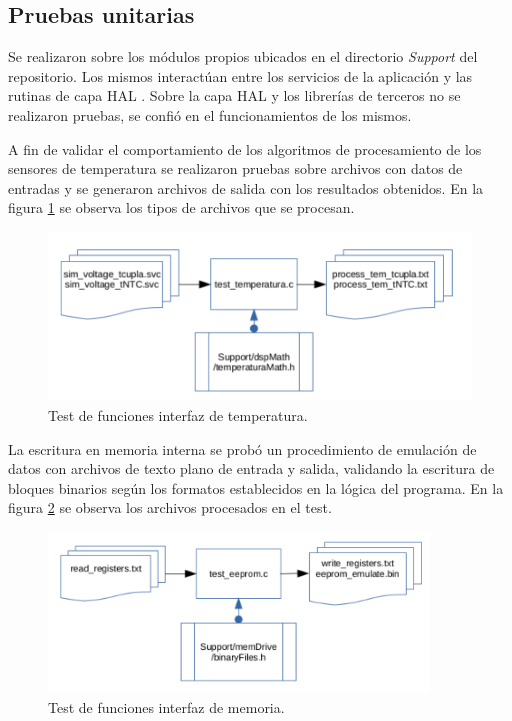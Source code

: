 \subsection{ Pruebas unitarias }

Se realizaron sobre los módulos propios ubicados en el directorio \textit{Support} del repositorio. Los mismos interactúan entre los servicios de la aplicación y las rutinas de capa HAL \footnotemark. Sobre la capa HAL y los librerías de terceros no se realizaron pruebas, se confió en el funcionamientos de los mismos.

A fin de validar el comportamiento de los algoritmos de procesamiento de los sensores de temperatura se realizaron pruebas sobre archivos con datos de entradas y se generaron archivos de salida con los resultados obtenidos. En la figura \ref{fig:diag_test_temp} se observa los tipos de archivos que se procesan.
\begin{figure}[h!]
	\centering
	\includegraphics[width=1.0\textwidth]{Figures/Cap_4/diag_test_temperatura}
	\caption{Test de funciones interfaz de temperatura.}
	\label{fig:diag_test_temp}
\end{figure}


La escritura en memoria interna se probó un procedimiento de emulación de datos con archivos de texto plano de entrada y salida,  validando la escritura de bloques binarios según los formatos establecidos en la lógica del programa. En la figura \ref{fig:diag_test_mem} se observa los archivos procesados en el test.
\begin{figure}[h!]
	\centering
	\includegraphics[width=0.9\textwidth]{Figures/Cap_4/diag_test_memoria}
	\caption{Test de funciones interfaz de memoria.}
	\label{fig:diag_test_mem}
\end{figure}

